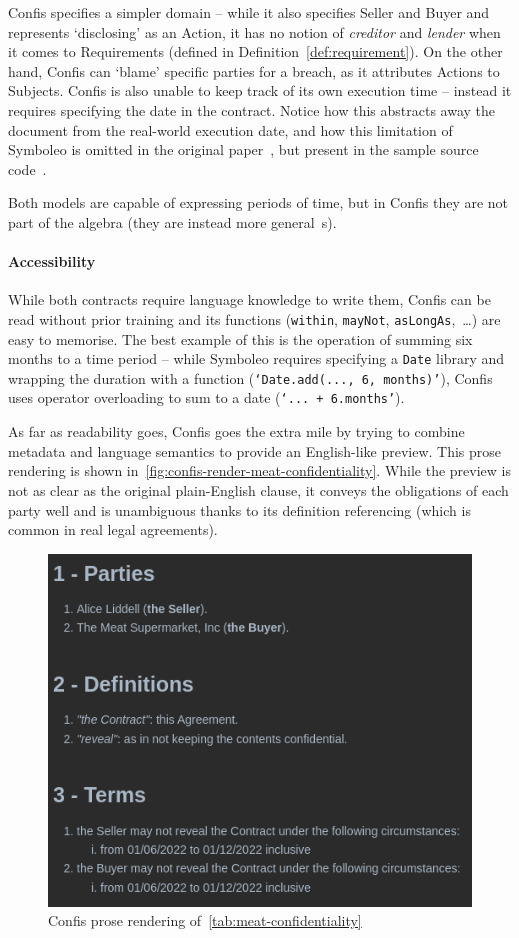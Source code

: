 Confis specifies a simpler domain -- while it also specifies Seller and Buyer and represents `disclosing' as an Action, it has no notion of \emph{creditor} and \emph{lender} when it comes to Requirements (defined in Definition~\autoref{def:requirement}).
On the other hand, Confis can `blame' specific parties for a breach, as it attributes Actions to Subjects.
Confis is also unable to keep track of its own execution time -- instead it requires specifying the date in the contract.
Notice how this abstracts away the document from the real-world execution date, and how this limitation of Symboleo is omitted in the original paper~\cite{symboleo2020}, but present in the sample source code~\cite{symboleoMeat}.

Both models are capable of expressing periods of time, but in Confis they are not part of the algebra (they are instead more general~s).

\paragraph{Accessibility}

While both contracts require language knowledge to write them, Confis can be read without prior training and its functions (\texttt{within}, \texttt{mayNot}, \texttt{asLongAs},~\dots) are easy to memorise.
The best example of this is the operation of summing six months to a time period -- while Symboleo requires specifying a \texttt{Date} library and wrapping the duration with a function (\texttt{`Date.add(..., 6, months)'}), Confis uses operator overloading to sum to a date (\texttt{`... + 6.months'}).

As far as readability goes, Confis goes the extra mile by trying to combine metadata and language semantics to provide an English-like preview.
This prose rendering is shown in~\autoref{fig:confis-render-meat-confidentiality}.
While the preview is not as clear as the original plain-English clause, it conveys the obligations of each party well and is unambiguous thanks to its definition referencing (which is common in real legal agreements).

\begin{figure}[H]
    \centering
    \includegraphics[width=0.67\columnwidth]{figures/confis.meat.prose}
    \caption{Confis prose rendering of~\autoref{tab:meat-confidentiality}}
    \label{fig:confis-render-meat-confidentiality}
\end{figure}

